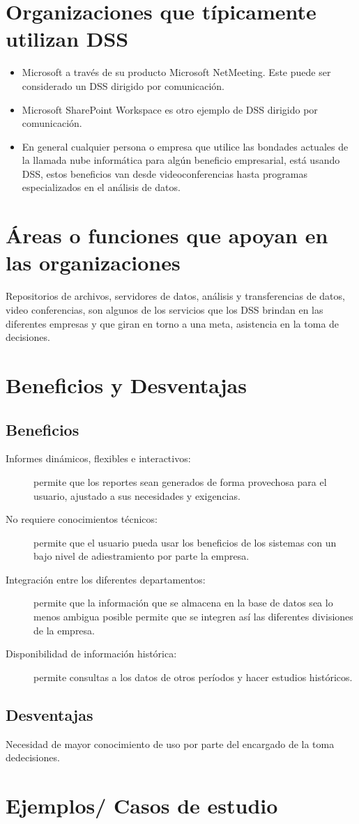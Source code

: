 \section {Organizaciones que típicamente utilizan DSS}
\begin{itemize}
\item Microsoft a través de su producto Microsoft NetMeeting. Este puede ser considerado un DSS dirigido por comunicación.
\item Microsoft SharePoint Workspace es otro ejemplo de DSS dirigido por comunicación.
\item En general cualquier persona o empresa que utilice las bondades actuales  de la llamada nube informática para algún beneficio empresarial, está  usando DSS, estos beneficios van desde videoconferencias hasta programas especializados en el análisis de datos.
\end{itemize}

\section {Áreas o funciones que apoyan en las organizaciones}
Repositorios de archivos, servidores de datos, análisis y transferencias de datos, video conferencias, son algunos de los servicios que los DSS brindan en las diferentes empresas y que giran en torno a una meta, asistencia en la toma de decisiones.

\section {Beneficios y Desventajas}

\subsection{Beneficios}
\begin{description}
\item [Informes dinámicos, flexibles e interactivos:] permite que los reportes sean generados de forma provechosa para el usuario, ajustado a sus necesidades y exigencias.
\item [No requiere conocimientos técnicos:] permite que el usuario pueda usar los beneficios de los sistemas con un bajo nivel de adiestramiento por parte la empresa.
\item [Integración entre los diferentes departamentos:] permite que la información que se almacena en la base de datos sea lo menos ambigua posible permite que se integren así las diferentes divisiones de la empresa.
\item [Disponibilidad de información histórica:] permite consultas a los datos de otros períodos y hacer estudios históricos.
\end{description}

\subsection{Desventajas}
\begin{description}
\item Necesidad de mayor conocimiento de uso por parte del encargado de la toma dedecisiones.
\end{description}

\section {Ejemplos/ Casos de estudio}
